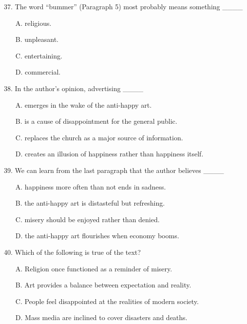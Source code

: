 \documentclass[UTF8,11pt]{ctexart}
\begin{document}
37. The word “bummer” (Paragraph 5) most probably means something \_\_\_\_


\begin{itemize}[leftmargin=2em,itemsep=.2em,topsep=.4em]\item[A.] religious.
\item[B.] unpleasant.
\item[C.] entertaining.
\item[D.] commercial.
\end{itemize}

38. In the author’s opinion, advertising \_\_\_\_


\begin{itemize}[leftmargin=2em,itemsep=.2em,topsep=.4em]\item[A.] emerges in the wake of the anti-happy art.
\item[B.] is a cause of disappointment for the general public.
\item[C.] replaces the church as a major source of information.
\item[D.] creates an illusion of happiness rather than happiness itself.
\end{itemize}

39. We can learn from the last paragraph that the author believes \_\_\_\_


\begin{itemize}[leftmargin=2em,itemsep=.2em,topsep=.4em]\item[A.] happiness more often than not ends in sadness.
\item[B.] the anti-happy art is distasteful but refreshing.
\item[C.] misery should be enjoyed rather than denied.
\item[D.] the anti-happy art flourishes when economy booms.
\end{itemize}

40. Which of the following is true of the text?


\begin{itemize}[leftmargin=2em,itemsep=.2em,topsep=.4em]\item[A.] Religion once functioned as a reminder of misery.
\item[B.] Art provides a balance between expectation and reality.
\item[C.] People feel disappointed at the realities of modern society.
\item[D.] Mass media are inclined to cover disasters and deaths.
\end{itemize}
\end{document}
